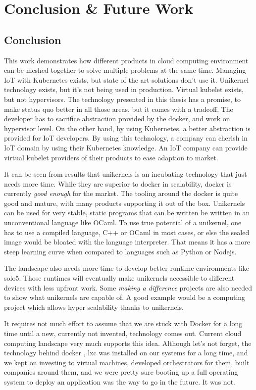 \chapter{Conclusion \& Future Work}\label{chapter:conclusion}
\section{Conclusion}
This work demonstrates how different products in cloud computing environment can be meshed together to solve multiple problems at the same time. Managing IoT with Kubernetes exists, but state of the art solutions don't use it. Unikernel technology exists, but it's not being used in production. Virtual kubelet exists, but not hypervisors. The technology presented in this thesis has a promise, to make status quo better in all those areas, but it comes with a tradeoff. The developer has to sacrifice abstraction provided by the docker, and work on hypervisor level. On the other hand, by using Kubernetes, a better abstraction is provided for IoT developers. By using this technology, a company can cherish in IoT domain by using their Kubernetes knowledge. An IoT company can provide virtual kubelet providers of their products to ease adaption to market.

It can be seen from results that unikernels is an incubating technology that just needs more time. While they are superior to docker in scalability, docker is currently \textit{good enough} for the market. The tooling around the docker is quite good and mature, with many products supporting it out of the box. Unikernels can be used for very stable, static programs that can be written be written in an unconventional language like OCaml. To use true potential of a unikernel, one has to use a compiled language, C++ or OCaml in most cases, or else the sealed image would be bloated with the language interpreter. That means it has a more steep learning curve when compared to languages such as Python or Nodejs.

The landscape also needs more time to develop better runtime environments like solo5. Those runtimes will eventually make unikernels accessible to different devices with less upfront work. Some \textit{making a difference} projects are also needed to show what unikernels are capable of. A good example would be a computing project which allows hyper scalability thanks to unikernels.

It requires not much effort to assume that we are stuck with Docker for a long time until a new, currently not invented, technology comes out. Current cloud computing landscape very much supports this idea. Although let's not forget, the technology behind docker , lxc was installed on our systems for a long time, and we kept on investing to virtual machines, developed orchestrators for them, built companies around them, and we were pretty sure booting up a full operating system to deploy an application was the way to go in the future. It was not.

